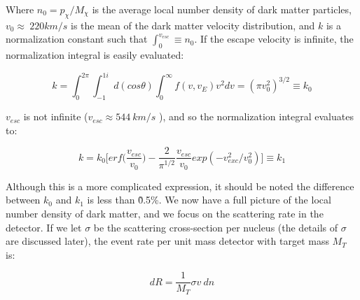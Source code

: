 Where $n_{0} = p_{\chi}/M_{\chi}$ is the average local number density of dark matter particles, $v_{0} \approx~220km/s$ \cite{?} is the mean of the dark matter velocity distribution, and $k$ is a normalization constant such that $\int_{0}^{v_{esc}} \equiv n_{0}$. If the escape velocity is infinite, the normalization integral is easily evaluated:

\begin{equation}
k = \int_{0}^{2\pi} \int_{-1}^{1i} d(cos\theta)  \int_{0}^{\infty} f(v, v_{E}) v^{2}dv = (\pi v_{0}^{2})^{3/2} \equiv k_{0}
\end{equation}

$v_{esc}$ is not infinite ($v_{esc} \approx 544~km/s$ \cite{Baudis2014}), and so the normalization integral evaluates to:

\begin{equation}
k =  k_{0} \Big[ erf\big(\frac{v_{esc}}{v_{0}}\big) - \frac{2}{\pi^{1/2}} \frac{v_{esc}}{v_{0}} exp(- v_{exc}^{2} / v_{0}^{2} ) \Big]  \equiv k_{1}
\end{equation}

Although this is a more complicated expression, it should be noted the difference between $k_{0}$ and $k_{1}$ is less than \~0.5\%. We now have a full picture of the local number density of dark matter, and we focus on the scattering rate in the detector. If we let $\sigma$ be the scattering cross-section per nucleus (the details of $\sigma$ are discussed later), the event rate per unit mass detector with target mass $M_{T}$ is:


\begin{equation}
\label{eq:rate}
dR = \frac{1}{M_{T}} \sigma  v~dn 
\end{equation}



